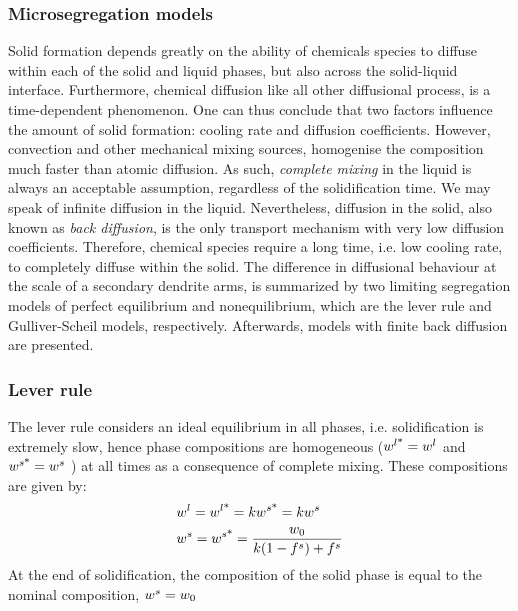 \subsubsection{Microsegregation models}
Solid formation depends greatly on the ability of chemicals species to diffuse within each of 
the solid and liquid phases, but also across the solid-liquid interface. Furthermore, chemical diffusion like all other 
diffusional process, is a time-dependent phenomenon. One can thus conclude that two factors
influence the amount of solid formation: cooling rate and diffusion coefficients. However, 
convection and other mechanical mixing sources, homogenise the composition much faster than atomic diffusion. 
As such, \emph{complete mixing} in the liquid is always an acceptable assumption, regardless of the 
solidification time. We may speak of infinite diffusion in the liquid. Nevertheless, diffusion in the solid, 
also known as \emph{back diffusion}, is the only transport mechanism with very low diffusion coefficients. 
Therefore, chemical species require a long time, i.e. low cooling rate, to completely diffuse within the solid.
The difference in diffusional behaviour at the scale of a secondary dendrite arms, is summarized by two limiting 
segregation models of perfect equilibrium  and nonequilibrium, which are the lever rule and Gulliver-Scheil models, respectively. 
Afterwards, models with finite back diffusion are presented. 
%
\subsubsection*{Lever rule}
The lever rule considers an ideal equilibrium in all phases, i.e. solidification is extremely slow, hence phase compositions are 
homogeneous ($ {w}^{l \text{*}}  = {w}^l$ and $ {w}^{s \text{*}}  = {w}^s$ ) at all times as a consequence of complete mixing. 
These compositions are given by:
\begin{align}
\label{eq:leverrule}
& {w}^l= {w}^{l \text{*}}  = k {w}^{s \text{*}}  = k {w}^s \\
& {w}^s= {w}^{s \text{*}}  = \frac{{w}_0}{k(1-{f^s}) + {f^s}}
\end{align}
At the end of solidification, the composition of the solid phase is equal to the nominal composition, ${w}^s = {w}_0$
%
